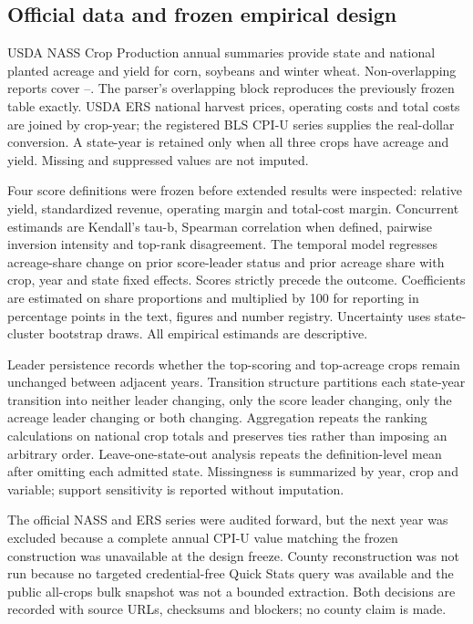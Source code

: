\subsection{Official data and frozen empirical design}
USDA NASS Crop Production annual summaries provide state and national planted acreage and yield for corn, soybeans and winter wheat. Non-overlapping reports cover \EmpiricalStartYear--\EmpiricalEndYear{}. The parser's overlapping \EmpiricalEndYear{} block reproduces the previously frozen table exactly. USDA ERS national harvest prices, operating costs and total costs are joined by crop-year; the registered BLS CPI-U series supplies the real-dollar conversion. A state-year is retained only when all three crops have acreage and yield. Missing and suppressed values are not imputed.

Four score definitions were frozen before extended results were inspected: relative yield, standardized revenue, operating margin and total-cost margin. Concurrent estimands are Kendall's tau-b, Spearman correlation when defined, pairwise inversion intensity and top-rank disagreement. The temporal model regresses acreage-share change on prior score-leader status and prior acreage share with crop, year and state fixed effects. Scores strictly precede the outcome. Coefficients are estimated on share proportions and multiplied by 100 for reporting in percentage points in the text, figures and number registry. Uncertainty uses \BootstrapReplications{} state-cluster bootstrap draws. All empirical estimands are descriptive.

Leader persistence records whether the top-scoring and top-acreage crops remain unchanged between adjacent years. Transition structure partitions each state-year transition into neither leader changing, only the score leader changing, only the acreage leader changing or both changing. Aggregation repeats the ranking calculations on national crop totals and preserves ties rather than imposing an arbitrary order. Leave-one-state-out analysis repeats the definition-level mean after omitting each admitted state. Missingness is summarized by year, crop and variable; support sensitivity is reported without imputation.

The official NASS and ERS series were audited forward, but the next year was excluded because a complete annual CPI-U value matching the frozen construction was unavailable at the design freeze. County reconstruction was not run because no targeted credential-free Quick Stats query was available and the public all-crops bulk snapshot was not a bounded extraction. Both decisions are recorded with source URLs, checksums and blockers; no county claim is made.


